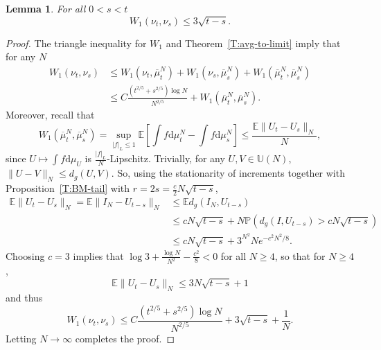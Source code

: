 \documentclass[11pt]{article}
\newtheorem{lemm}[theo]{Lemma}
\theoremstyle{definition}
\numberwithin{equation}{section}
\numberwithin{figure}{section}
\numberwithin{table}{section}
\newcommand{\Unitary}[1]{\mathbb{U}\left(#1\right)}
\newcommand{\E}{\mathbb{E}}
\newcommand{\Prob}{\mathbb{P}}
\newcommand*{\dd}{\mathrm{d}}
\newcommand*{\dmu}{\dd \mu}
\begin{document}
\begin{lemm}\label{T:nu-continuity}
For all $0<s<t$
\[
W_1(\nu_t,\nu_s)\le 3\sqrt{t-s}.
\]
\end{lemm}

\begin{proof}
The triangle inequality for $W_1$ and Theorem~\ref{T:avg-to-limit} imply that for any $N$
\begin{align*}
W_1(\nu_t,\nu_s)
&\le W_1(\nu_t,\overline{\mu}^N_t)+ W_1(\nu_s,\overline{\mu}^N_s)+ W_1(\overline{\mu}^N_t,\overline{\mu}^N_s)\\
&\le C\frac{(t^{2/5}+s^{2/5})\log N}{N^{2/5}}+W_1(\overline{\mu}^N_t,\overline{\mu}^N_s).
\end{align*}
Moreover, recall that
\[
W_1(\overline{\mu}^N_t,\overline{\mu}^N_s)=\sup_{|f|_L\le 1}\E\left[\int f\dmu_t^N-\int f\dmu^N_s\right]\le\frac{\E\|U_t-U_s\|_N}{N},
\]
since $U\mapsto\int f\dmu_U$ is $\frac{|f|_L}{N}$-Lipschitz. Trivially, for any $U,V\in\Unitary{N}$, $\|U-V\|_N\le d_g(U,V)$. So, using the stationarity of increments together with Proposition~\ref{T:BM-tail} with $r=2s=\frac{c}{2}N\sqrt{t-s}$,
\begin{align*}
\E\|U_t-U_s\|_N=\E\|I_N-U_{t-s}\|_N &\le \E d_g(I_N,U_{t-s})\\
&\le cN\sqrt{t-s}+N\Prob\left(d_g(I,U_{t-s})>cN\sqrt{t-s}\right)\\
&\le cN\sqrt{t-s}+3^{N^2}Ne^{-c^2N^2/8}.
\end{align*}
Choosing $c=3$ implies that $\log3+\frac{\log N}{N^2}-\frac{c^2}{8}<0$ for all $N\ge 4$, so that for $N\ge 4$,
\[
\E\|U_t-U_s\|_N\le 3N\sqrt{t-s}+1
\]
and thus
\[
W_1(\nu_t,\nu_s)\le C\frac{(t^{2/5}+s^{2/5})\log N}{N^{2/5}} + 3\sqrt{t-s}+\frac{1}{N}.
\]
Letting $N\to\infty$ completes the proof.
\end{proof}
\end{document}
